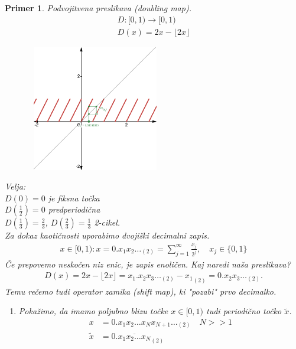 \documentclass{article}
\newtheorem{primer}{Primer}
\begin{document}
\begin{primer}
Podvojitvena preslikava (doubling map).
\begin{align*}
D:[0, 1) \rightarrow [0, 1) \\ 
D(x) = 2x - \lfloor{2x}\rfloor
\end{align*}
\begin{figure}[h!]
    \begin{center}
        \includegraphics[width=6cm, height=5.5cm]{Grafi/cobweb7.png}
    \end{center}
\end{figure}   
\noindent
Velja: \\ 
$D(0) = 0$ je fiksna točka \\ 
$D(\frac{1}{2}) = 0$ predperiodična \\ 
$D(\frac{1}{3}) = \frac{2}{3}$, $D(\frac{2}{3}) = \frac{1}{3}$ 2-cikel.\\
Za dokaz kaotičnosti uporabimo dvojiški decimalni zapis.
\begin{align*}
x\in [0, 1): x = 0.x_1 x_2 \dots_{(2)} = \sum_{j=1}^\infty \frac{x_j}{2^j}, \quad x_j\in \{0, 1\}
\end{align*}
Če prepovemo neskočen niz enic, je zapis enoličen. Kaj naredi naša preslikava?
\begin{align*}
D(x) = 2x - \lfloor 2x \rfloor = x_1.x_2 x_3 \dots_{(2)} - {x_1}_{(2)} = 0.x_2 x_3 \dots_{(2)}.
\end{align*}
Temu rečemo tudi operator zamika (shift map), ki "pozabi" prvo decimalko. 
\begin{enumerate}
\item[(C1)] Pokažimo, da imamo poljubno blizu točke $x\in [0, 1)$ tudi periodično točko $\tilde{x}$.
\begin{align*}
x &= 0.x_1 x_2 \dots x_N x_{N+1} \dots_{(2)} \quad N >> 1 \\ 
\tilde{x} &= 0.\overline{x_1 x_2 \dots x_N}_{(2)}\\

\end{align*}
\end{enumerate}
\end{primer}
\end{document}
